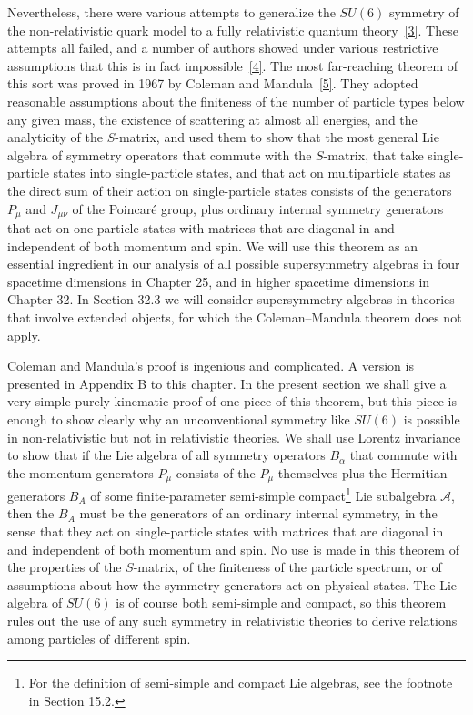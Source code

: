 Nevertheless, there were various attempts to generalize the $SU(6)$ symmetry
of the non-relativistic quark model to a fully relativistic quantum
theory~\hyperref[ch24-ref-3]{[3]}. These attempts all failed, and a number of
authors showed under various restrictive assumptions that this is in fact
impossible~\hyperref[ch24-ref-4]{[4]}. The most far-reaching theorem of this
sort was proved in 1967 by Coleman and Mandula~\hyperref[ch24-ref-5]{[5]}. They
adopted reasonable assumptions about the finiteness of the number of particle
types below any given mass, the existence of scattering at almost all energies,
and the analyticity of the $S$-matrix, and used them to show that the most
general Lie algebra of symmetry operators that commute with the $S$-matrix,
that take single-particle states into single-particle states, and that act on
multiparticle states as the direct sum of their action on single-particle
states consists of the generators $P_\mu$ and $J_{\mu\nu}$ of the Poincar\'e
group, plus ordinary internal symmetry generators that act on one-particle
states with matrices that are diagonal in and independent of both momentum and
spin. We will use this theorem as an essential ingredient in our analysis of
all possible supersymmetry algebras in four spacetime dimensions in Chapter 25,
and in higher spacetime dimensions in Chapter 32. In Section 32.3 we will
consider supersymmetry algebras in theories that involve extended objects, for
which the Coleman--Mandula theorem does not apply.

Coleman and Mandula's proof is ingenious and complicated. A version is
presented in Appendix B to this chapter. In the present section we shall give a
very simple purely kinematic proof of one piece of this theorem, but this piece
is enough to show clearly why an unconventional symmetry like $SU(6)$ is
possible in non-relativistic but not in relativistic theories. We shall use
Lorentz invariance to show that if the Lie algebra of all symmetry operators
$B_\alpha$ that commute with the momentum generators $P_\mu$ consists of the
$P_\mu$ themselves plus the Hermitian generators $B_A$ of some
finite-parameter semi-simple compact\footnote{For the definition of
semi-simple and compact Lie algebras, see the footnote in Section 15.2.} Lie
subalgebra $\mathcal{A}$, then the $B_A$ must be the generators of an ordinary
internal symmetry, in the sense that they act on single-particle states with
matrices that are diagonal in and independent of both momentum and spin. No use
is made in this theorem of the properties of the $S$-matrix, of the finiteness
of the particle spectrum, or of assumptions about how the symmetry generators
act on physical states. The Lie algebra of $SU(6)$ is of course both
semi-simple and compact, so this theorem rules out the use of any such symmetry
in relativistic theories to derive relations among particles of different
spin.

